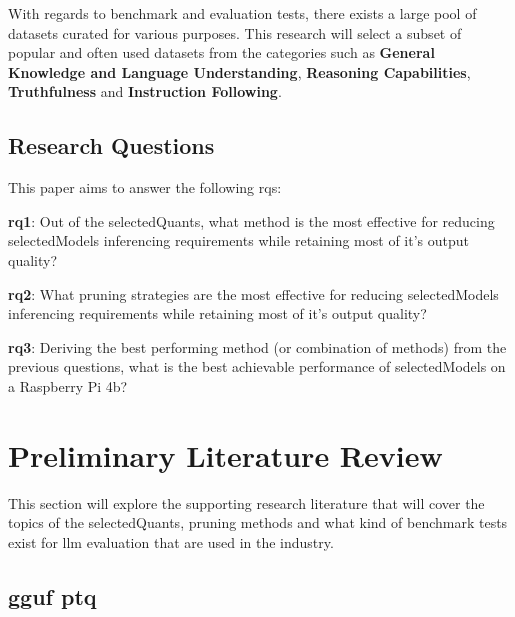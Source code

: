 \documentclass{ifacconf}
\begin{document}
	With regards to benchmark and evaluation tests, there exists a large pool of datasets curated for various purposes. This research will select a subset of popular and often used datasets from the categories such as \textbf{General Knowledge and Language Understanding}, \textbf{Reasoning Capabilities}, \textbf{Truthfulness} and \textbf{Instruction Following}.
	
	\subsection{Research Questions}
	This paper aims to answer the following \glspl{rq}:
	
	\textbf{\gls{rq}1}: Out of the \gls{selectedQuants}, what method is the most effective for reducing \gls{selectedModels} inferencing requirements while retaining most of it's output quality?
	
	\textbf{\gls{rq}2}: What pruning strategies are the most effective for reducing \gls{selectedModels} inferencing requirements while retaining most of it's output quality?
	
	\textbf{\gls{rq}3}: Deriving the best performing method (or combination of methods) from the previous questions, what is the best achievable performance of \gls{selectedModels} on a Raspberry Pi 4b?
	
	
	\section{Preliminary Literature Review}
	This section will explore the supporting research literature that will cover the topics of the \gls{selectedQuants}, pruning methods and what kind of benchmark tests exist for \gls{llm} evaluation that are used in the industry. 
	
	\subsection{\gls{gguf} \gls{ptq}}
	
\end{document}
